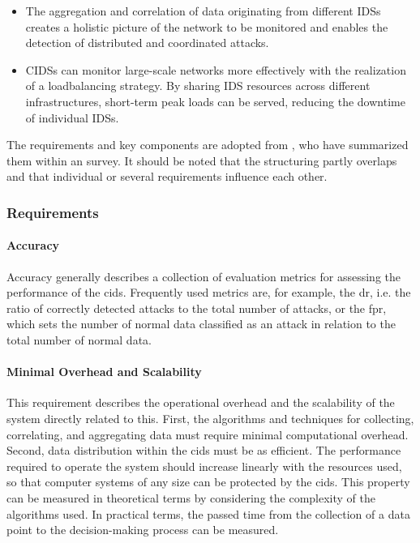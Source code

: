 \begin{itemize}
    \item The aggregation and correlation of data originating from different IDSs creates a holistic picture of the network to be monitored and enables the detection of distributed and coordinated attacks.
    \item CIDSs can monitor large-scale networks more effectively with the realization of a loadbalancing strategy. By sharing IDS resources across different infrastructures, short-term peak loads can be served, reducing the downtime of individual IDSs.
\end{itemize}

The requirements and key components are adopted from \cite{vas_2015}, who have summarized them within an survey. It should be noted that the structuring partly overlaps and that individual or several requirements influence each other. 

\subsubsection{Requirements}

\paragraph{Accuracy} Accuracy generally describes a collection of evaluation metrics for assessing the performance of the \acrshort{cids}. Frequently used metrics are, for example, the \acrfull{dr}, i.e. the ratio of correctly detected attacks to the total number of attacks, or the \acrfull{fpr}, which sets the number of normal data classified as an attack in relation to the total number of normal data. 

\paragraph{Minimal Overhead and Scalability} This requirement describes the operational overhead and the scalability of the system directly related to this. First, the algorithms and techniques for collecting, correlating, and aggregating data must require minimal computational overhead. Second, data distribution within the \acrshort{cids} must be as efficient. The performance required to operate the system should increase linearly with the resources used, so that computer systems of any size can be protected by the \acrshort{cids}. This property can be measured in theoretical terms by considering the complexity of the algorithms used. In practical terms, the passed time from the collection of a data point to the decision-making process can be measured.

